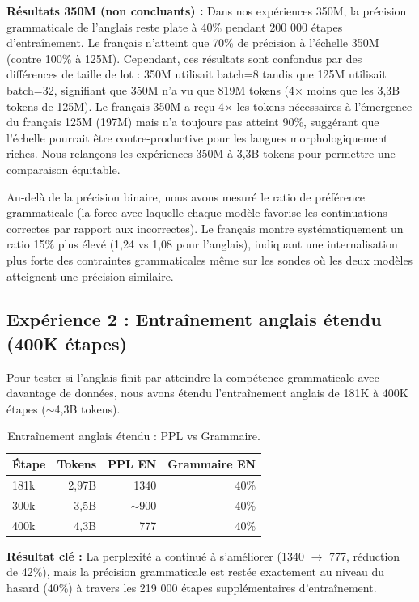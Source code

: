 \documentclass[11pt,a4paper]{article}
\begin{document}
\textbf{Résultats 350M (non concluants) :} Dans nos expériences 350M, la précision grammaticale de l'anglais reste plate à 40\% pendant 200 000 étapes d'entraînement. Le français n'atteint que 70\% de précision à l'échelle 350M (contre 100\% à 125M). Cependant, ces résultats sont confondus par des différences de taille de lot : 350M utilisait batch=8 tandis que 125M utilisait batch=32, signifiant que 350M n'a vu que 819M tokens (4$\times$ moins que les 3,3B tokens de 125M). Le français 350M a reçu 4$\times$ les tokens nécessaires à l'émergence du français 125M (197M) mais n'a toujours pas atteint 90\%, suggérant que l'échelle pourrait être contre-productive pour les langues morphologiquement riches. Nous relançons les expériences 350M à 3,3B tokens pour permettre une comparaison équitable.

Au-delà de la précision binaire, nous avons mesuré le ratio de préférence grammaticale (la force avec laquelle chaque modèle favorise les continuations correctes par rapport aux incorrectes). Le français montre systématiquement un ratio 15\% plus élevé (1,24 vs 1,08 pour l'anglais), indiquant une internalisation plus forte des contraintes grammaticales même sur les sondes où les deux modèles atteignent une précision similaire.

\subsection{Expérience 2 : Entraînement anglais étendu (400K étapes)}

Pour tester si l'anglais finit par atteindre la compétence grammaticale avec davantage de données, nous avons étendu l'entraînement anglais de 181K à 400K étapes ($\sim$4,3B tokens).

\begin{table}[H]
\centering
\begin{tabular}{lrrr}
\toprule
\textbf{Étape} & \textbf{Tokens} & \textbf{PPL EN} & \textbf{Grammaire EN} \\
\midrule
181k & 2,97B & 1340 & 40\% \\
300k & 3,5B & $\sim$900 & 40\% \\
400k & 4,3B & 777 & 40\% \\
\bottomrule
\end{tabular}
\caption{Entraînement anglais étendu : PPL vs Grammaire.}
\label{tab:extended}
\end{table}

\textbf{Résultat clé :} La perplexité a continué à s'améliorer (1340 $\rightarrow$ 777, réduction de 42\%), mais la précision grammaticale est restée exactement au niveau du hasard (40\%) à travers les 219 000 étapes supplémentaires d'entraînement.
\end{document}
